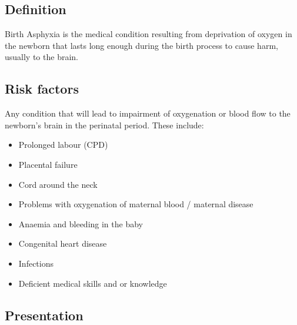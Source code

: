 \documentclass[
  letterpaper,
  DIV=11,
  numbers=noendperiod]{scrreprt}
\providecommand{\tightlist}{%
  \setlength{\itemsep}{0pt}\setlength{\parskip}{0pt}}\usepackage{longtable,booktabs,array}
\begin{document}
\hypertarget{definition-1}{%
\subsection{Definition}\label{definition-1}}

\begin{tcolorbox}[enhanced jigsaw, left=2mm, toptitle=1mm, colbacktitle=quarto-callout-important-color!10!white, opacityback=0, bottomtitle=1mm, toprule=.15mm, titlerule=0mm, colback=white, breakable, opacitybacktitle=0.6, title=\textcolor{quarto-callout-important-color}{\faExclamation}\hspace{0.5em}{World Health Organisation definition}, leftrule=.75mm, arc=.35mm, colframe=quarto-callout-important-color-frame, rightrule=.15mm, bottomrule=.15mm, coltitle=black]

Birth Asphyxia is the medical condition resulting from deprivation of
oxygen in the newborn that lasts long enough during the birth process to
cause harm, usually to the brain.

\end{tcolorbox}

\hypertarget{risk-factors}{%
\subsection{Risk factors}\label{risk-factors}}

Any condition that will lead to impairment of oxygenation or blood flow
to the newborn's brain in the perinatal period. These include:

\begin{itemize}
\tightlist
\item
  Prolonged labour (CPD)
\item
  Placental failure
\item
  Cord around the neck
\item
  Problems with oxygenation of maternal blood / maternal disease
\item
  Anaemia and bleeding in the baby
\item
  Congenital heart disease
\item
  Infections
\item
  Deficient medical skills and or knowledge
\end{itemize}

\hypertarget{presentation}{%
\subsection{Presentation}\label{presentation}}
\end{document}
